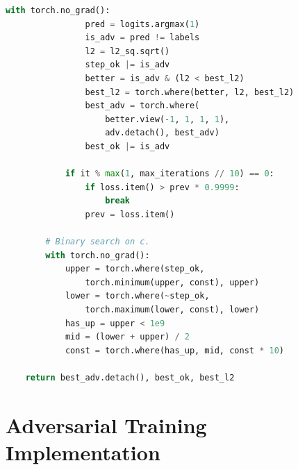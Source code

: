 \begin{lstlisting}[language=Python, caption={Carlini--Wagner $L_2$ Attack Implementation}, label={lst:cw}]
            with torch.no_grad():
                pred = logits.argmax(1)
                is_adv = pred != labels
                l2 = l2_sq.sqrt()
                step_ok |= is_adv
                better = is_adv & (l2 < best_l2)
                best_l2 = torch.where(better, l2, best_l2)
                best_adv = torch.where(
                    better.view(-1, 1, 1, 1),
                    adv.detach(), best_adv)
                best_ok |= is_adv

            if it % max(1, max_iterations // 10) == 0:
                if loss.item() > prev * 0.9999:
                    break
                prev = loss.item()

        # Binary search on c.
        with torch.no_grad():
            upper = torch.where(step_ok,
                torch.minimum(upper, const), upper)
            lower = torch.where(~step_ok,
                torch.maximum(lower, const), lower)
            has_up = upper < 1e9
            mid = (lower + upper) / 2
            const = torch.where(has_up, mid, const * 10)

    return best_adv.detach(), best_ok, best_l2
\end{lstlisting}

\section{Adversarial Training Implementation}

